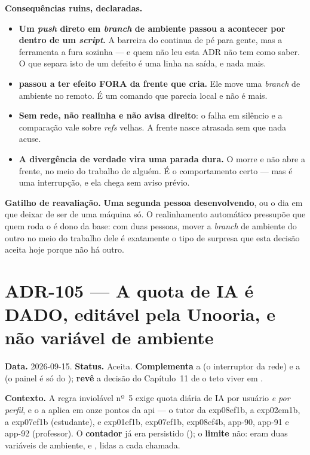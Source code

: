 \textbf{Consequências ruins, declaradas.}

\begin{itemize}
  \item \textbf{Um \emph{push} direto em \emph{branch} de ambiente passou a
    acontecer por dentro de um \emph{script}.} A barreira do 
    continua de pé para gente, mas a ferramenta a fura sozinha --- e quem não
    leu esta ADR não tem como saber. O que separa isto de um defeito é uma
    linha na saída, e nada mais.
  \item \textbf{ passou a ter efeito FORA da frente que cria.} Ele
    move uma \emph{branch} de ambiente no remoto. É um comando que parecia
    local e não é mais.
  \item \textbf{Sem rede, não realinha e não avisa direito}: o  falha
    em silêncio e a comparação vale sobre \emph{refs} velhas. A frente nasce
    atrasada sem que nada acuse.
  \item \textbf{A divergência de verdade vira uma parada dura.} O 
    morre e não abre a frente, no meio do trabalho de alguém. É o comportamento
    certo --- mas é uma interrupção, e ela chega sem aviso prévio.
\end{itemize}

\textbf{Gatilho de reavaliação.} \textbf{Uma segunda pessoa desenvolvendo}, ou
o dia em que  deixar de ser de uma máquina só. O realinhamento
automático pressupõe que quem roda o  é dono da base: com duas
pessoas, mover a \emph{branch} de ambiente do outro no meio do trabalho dele é
exatamente o tipo de surpresa que esta decisão aceita hoje porque não há outro.

\section{ADR-105 --- A quota de IA é DADO, editável pela Unooria, e não variável de ambiente}
\label{adr:quota-de-ia-dado}

\textbf{Data.} 2026-09-15. \textbf{Status.} Aceita.
\textbf{Complementa} a  (o interruptor da rede) e a 
(o painel é só do ); \textbf{revê} a decisão do Capítulo~11 de o teto
viver em .

\textbf{Contexto.} A regra inviolável nº~5 exige quota diária de IA por usuário
\emph{e por perfil}, e o  a aplica em onze pontos da api ---
o tutor da exp08ef1b, a exp02em1b, a exp07ef1b (estudante), e exp01ef1b, exp07ef1b, exp08ef4b,
app-90, app-91 e app-92 (professor). O \textbf{contador} já era persistido
(); o \textbf{limite} não: eram duas variáveis de ambiente,
 e
, lidas a cada chamada.

